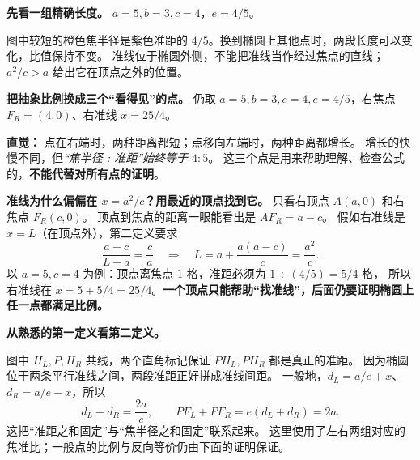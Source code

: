 \clearpage
\begin{explanationbox}
\textbf{先看一组精确长度。} $a=5,b=3,c=4$，$e=4/5$。

图中较短的橙色焦半径是紫色准距的 $4/5$。换到椭圆上其他点时，两段长度可以变化，比值保持不变。
准线位于椭圆外侧，不能把准线当作经过焦点的直线；$a^2/c>a$ 给出它在顶点之外的位置。

\medskip
\end{explanationbox}
\clearpage
\begin{explanationbox}
\textbf{把抽象比例换成三个“看得见”的点。}
仍取 $a=5,b=3,c=4,e=4/5$，右焦点 $F_R=(4,0)$、右准线 $x=25/4$。

\textbf{直觉：} 点在右端时，两种距离都短；点移向左端时，两种距离都增长。
增长的快慢不同，但\emph{“焦半径 : 准距”始终等于 $4:5$}。
这三个点是用来帮助理解、检查公式的，\textbf{不能代替对所有点的证明}。

\medskip
\textbf{准线为什么偏偏在 $x=a^2/c$？用最近的顶点找到它。}
只看右顶点 $A(a,0)$ 和右焦点 $F_R(c,0)$。
顶点到焦点的距离一眼能看出是 $AF_R=a-c$。
假如右准线是 $x=L$（在顶点外），第二定义要求
\[
\frac{a-c}{L-a}=\frac ca
\quad\Longrightarrow\quad
L=a+\frac{a(a-c)}c=\boxed{\frac{a^2}{c}}.
\]
以 $a=5,c=4$ 为例：顶点离焦点 $1$ 格，准距必须为 $1\div(4/5)=5/4$ 格，
所以右准线在 $x=5+5/4=25/4$。\textbf{一个顶点只能帮助“找准线”，后面仍要证明椭圆上任一点都满足比例。}

\medskip
\end{explanationbox}
\clearpage
\begin{explanationbox}
\textbf{从熟悉的第一定义看第二定义。}

图中 $H_L,P,H_R$ 共线，两个直角标记保证 $PH_L,PH_R$ 都是真正的准距。
因为椭圆位于两条平行准线之间，两段准距正好拼成准线间距。
一般地，$d_L=a/e+x$、$d_R=a/e-x$，所以
\[
d_L+d_R=\frac{2a}{e},\qquad
PF_L+PF_R=e(d_L+d_R)=2a.
\]
这把“准距之和固定”与“焦半径之和固定”联系起来。
这里使用了左右两组对应的焦准比；一般点的比例与反向等价仍由下面的证明保证。

\end{explanationbox}
\clearpage
